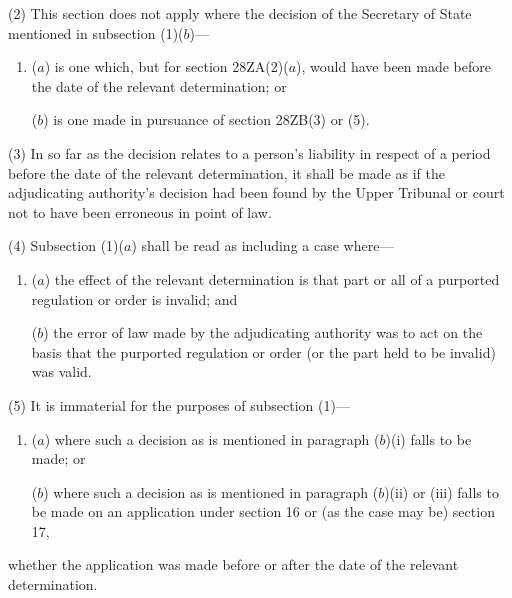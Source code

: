 \documentclass[12pt,a4paper]{article}
\begin{document}
(2) This section does not apply where the decision of the 
Secretary of State  %
mentioned in subsection (1)($b$)—
\begin{enumerate}\item[]
($a$) is one which, but for section 28ZA(2)($a$), would have been made before the date of the relevant determination; or

($b$) is one made in pursuance of section 28ZB(3) or (5).
\end{enumerate}

(3) In so far as the decision relates to a person’s liability 
in respect of a period before the date of the relevant determination, it shall be made as if the adjudicating authority’s decision had been found by the 
Upper Tribunal  %
or court not to have been erroneous in point of law.

(4) Subsection (1)($a$) shall be read as including a case where—
\begin{enumerate}\item[]
($a$) the effect of the relevant determination is that part or all of a purported regulation or order is invalid; and

($b$) the error of law made by the adjudicating authority was to act on the basis that the purported regulation or order (or the part held to be invalid) was valid.
\end{enumerate}

(5) It is immaterial for the purposes of subsection (1)—
\begin{enumerate}\item[]
($a$) where such a decision as is mentioned in paragraph ($b$)(i) falls to be made; or

($b$) where such a decision as is mentioned in paragraph ($b$)(ii) or (iii) falls to be made on an application under section 16 or (as the case may be) section 17,
\end{enumerate}
whether the application was made before or after the date of the relevant determination.
\end{document}
